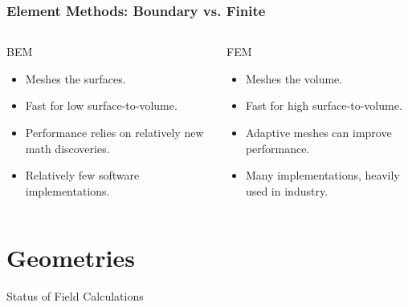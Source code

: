 \documentclass[xcolor=dvipsnames]{beamer}
\begin{document}
\begin{frame}
  \frametitle{Element Methods: Boundary vs. Finite}
  \begin{columns}
    \begin{column}{0.5\textwidth}
      BEM
      \begin{itemize}
      \item Meshes the surfaces.
      \item Fast for low surface-to-volume.
      \item Performance relies on relatively new math discoveries.
      \item Relatively few software implementations.
      \end{itemize}      
    \end{column}
    \begin{column}{0.5\textwidth}
      FEM
      \begin{itemize}
      \item Meshes the volume.
      \item Fast for high surface-to-volume.
      \item Adaptive meshes can improve performance.
      \item Many implementations, heavily used in industry.
      \end{itemize}      
    \end{column}
  \end{columns}
\end{frame}

\section{Geometries}

\begin{frame}{Status of Field Calculations}
  \tableofcontents[currentsection]
\end{frame}
\end{document}
